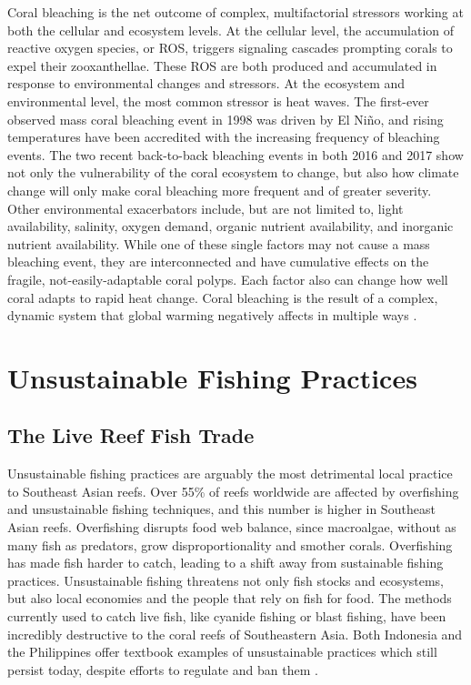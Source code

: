 \documentclass{book}\usepackage{knitr}
\begin{document}
Coral bleaching is the net outcome of complex, multifactorial stressors working at both the cellular and ecosystem levels. At the cellular level, the accumulation of reactive oxygen species, or ROS, triggers signaling cascades prompting corals to expel their zooxanthellae. These ROS are both produced and accumulated in response to environmental changes and stressors. At the ecosystem and environmental level, the most common stressor is heat waves. The first-ever observed mass coral bleaching event in 1998 was driven by El Niño, and rising temperatures have been accredited with the increasing frequency of bleaching events. The two recent back-to-back bleaching events in both 2016 and 2017 show not only the vulnerability of the coral ecosystem to change, but also how climate change will only make coral bleaching more frequent and of greater severity. Other environmental exacerbators include, but are not limited to, light availability, salinity, oxygen demand, organic nutrient availability, and inorganic nutrient availability. While one of these single factors may not cause a mass bleaching event, they are interconnected and have cumulative effects on the fragile, not-easily-adaptable coral polyps. Each factor also can change how well coral adapts to rapid heat change. Coral bleaching is the result of a complex, dynamic system that global warming negatively affects in multiple ways \citep{https://doi.org/10.1111/gcb.14871}.

\section{Unsustainable Fishing Practices}

\subsection{The Live Reef Fish Trade}

Unsustainable fishing practices are arguably the most detrimental local practice to Southeast Asian reefs. Over 55\% of reefs worldwide are affected by overfishing and unsustainable fishing techniques, and this number is higher in Southeast Asian reefs. Overfishing disrupts food web balance, since macroalgae, without as many fish as predators, grow disproportionality and smother corals. Overfishing has made fish harder to catch, leading to a shift away from sustainable fishing practices. Unsustainable fishing threatens not only fish stocks and ecosystems, but also local economies and the people that rely on fish for food. The methods currently used to catch live fish, like cyanide fishing or blast fishing, have been incredibly destructive to the coral reefs of Southeastern Asia. Both Indonesia and the Philippines offer textbook examples of unsustainable practices which still persist today, despite efforts to regulate and ban them \citep{coralreefalliance_2021}.
\end{document}
